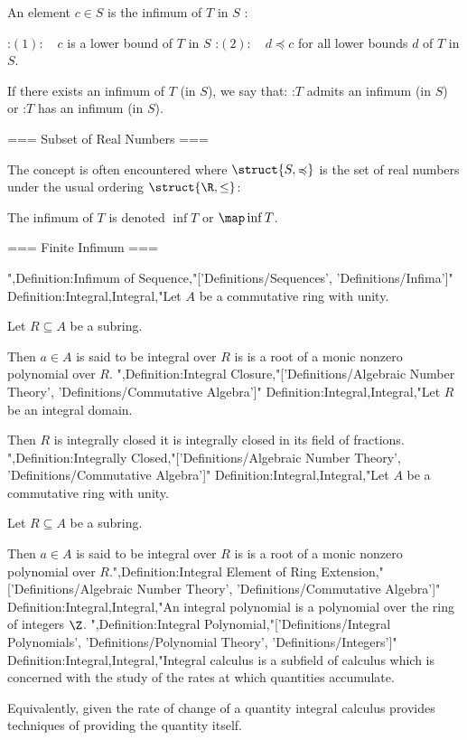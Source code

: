 An element $c \in S$ is the infimum of $T$ in $S$ :

:$(1): \quad c$ is a lower bound of $T$ in $S$
:$(2): \quad d \preccurlyeq c$ for all lower bounds $d$ of $T$ in $S$.


If there exists an infimum of $T$ (in $S$), we say that:
:$T$ admits an infimum (in $S$) or
:$T$ has an infimum (in $S$).


=== Subset of Real Numbers ===

The concept is often encountered where $\struct {S, \preccurlyeq}$ is the set of real numbers under the usual ordering $\struct {\R, \le}$:



The infimum of $T$ is denoted $\inf T$ or $\map \inf T$.


=== Finite Infimum ===

",Definition:Infimum of Sequence,"['Definitions/Sequences', 'Definitions/Infima']"
Definition:Integral,Integral,"Let $A$ be a commutative ring with unity.

Let $R \subseteq A$ be a subring.


Then $a \in A$ is said to be integral over $R$  is is a root of a monic nonzero polynomial over $R$.
",Definition:Integral Closure,"['Definitions/Algebraic Number Theory', 'Definitions/Commutative Algebra']"
Definition:Integral,Integral,"Let $R$ be an integral domain.


Then $R$ is integrally closed  it is integrally closed in its field of fractions.
",Definition:Integrally Closed,"['Definitions/Algebraic Number Theory', 'Definitions/Commutative Algebra']"
Definition:Integral,Integral,"Let $A$ be a commutative ring with unity.

Let $R \subseteq A$ be a subring.


Then $a \in A$ is said to be integral over $R$  is is a root of a monic nonzero polynomial over $R$.",Definition:Integral Element of Ring Extension,"['Definitions/Algebraic Number Theory', 'Definitions/Commutative Algebra']"
Definition:Integral,Integral,"An integral polynomial is a polynomial over the ring of integers $\Z$.
",Definition:Integral Polynomial,"['Definitions/Integral Polynomials', 'Definitions/Polynomial Theory', 'Definitions/Integers']"
Definition:Integral,Integral,"Integral calculus is a subfield of calculus which is concerned with the study of the rates at which quantities accumulate.

Equivalently, given the rate of change of a quantity integral calculus provides techniques of providing the quantity itself.

